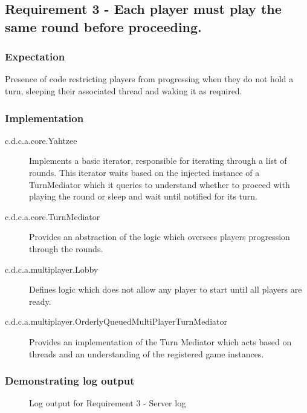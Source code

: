 \subsection{Requirement 3 - Each player must play the same round before proceeding.} 

\subsubsection{Expectation} 
Presence of code restricting players from progressing when they do not hold a turn, sleeping their associated thread and waking it as required.

\subsubsection{Implementation}

\begin{description}
	\item[c.d.c.a.core.Yahtzee]  Implements a basic iterator, responsible for iterating through a list of rounds. This iterator waits based on the injected instance of a TurnMediator which it queries to understand whether to proceed with playing the round or sleep and wait until notified for its turn.
	
	\item[c.d.c.a.core.TurnMediator] Provides an abstraction of the logic which oversees players progression through the rounds.
	
	\item[c.d.c.a.multiplayer.Lobby] Defines logic which does not allow any player to start until all players are ready.
	
	\item[c.d.c.a.multiplayer.OrderlyQueuedMultiPlayerTurnMediator] Provides an implementation of the Turn Mediator which acts based on threads and an understanding of the registered game instances.
	
\end{description} 

\subsubsection{Demonstrating log output} 
\begin{figure}[H]
	
	\caption{Log output for Requirement 3 - Server log}
\end{figure}

